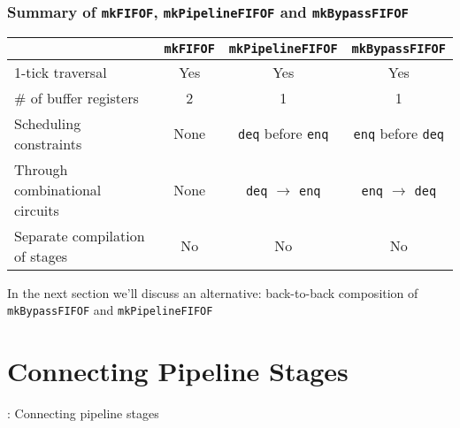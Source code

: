 \begin{frame}

\frametitle{Summary of {\tt mkFIFOF}, {\tt mkPipelineFIFOF} and {\tt mkBypassFIFOF}}

\footnotesize

\begin{center}
    \begin{tabular}{|l|c|c|c|}
      \hline
          &
          {\tt mkFIFOF} &
          {\tt mkPipelineFIFOF} &
          {\tt mkBypassFIFOF} \\
      \hline
      \hline
        1-tick traversal       &   Yes   &  Yes  &  Yes  \\
      \hline
        \# of buffer registers &    2    &   1   &   1   \\
      \hline
        Scheduling constraints &
        None &
        {\tt deq} before {\tt enq} &
        {\tt enq} before {\tt deq} \\
      \hline
        Through combinational circuits &
        None &
        {\tt deq} $\rightarrow$ {\tt enq} &
        {\tt enq} $\rightarrow$ {\tt deq} \\
      \hline
        Separate compilation of stages &
        No &
        No &
        No \\
      \hline
    \end{tabular}
\end{center}

\vx

In the next section we'll discuss an alternative: back-to-back
composition of {\tt mkBypassFIFOF} and {\tt mkPipelineFIFOF}

\end{frame}


\section{Connecting Pipeline Stages}

\begin{frame}

\begin{center}
  {\LARGE {\BSV}: Connecting pipeline stages}
\end{center}

\end{frame}


